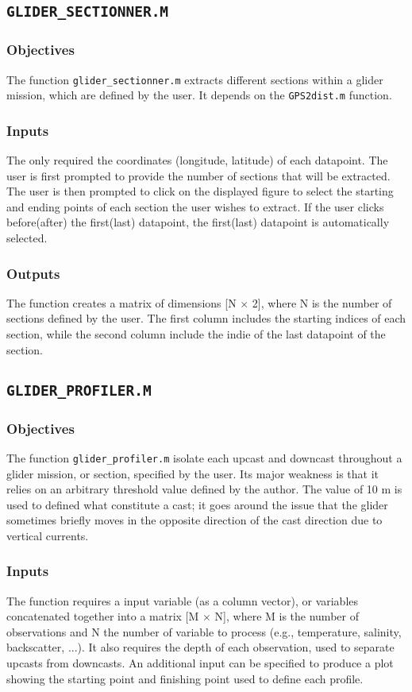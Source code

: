 \documentclass[11pt,A4]{report}
\begin{document}
\subsection{\texttt{GLIDER\_SECTIONNER.M}}
\subsubsection{Objectives}
The function \texttt{glider\_sectionner.m} extracts different sections within a glider mission, which are defined by the user. It depends on the \texttt{GPS2dist.m} function.

\subsubsection{Inputs}
The only required the coordinates (longitude, latitude) of each datapoint. The user is first prompted to provide the number of sections that will be extracted. The user is then prompted to click on the displayed figure to select the starting and ending points of each section the user wishes to extract. If the user clicks before(after) the first(last) datapoint, the first(last) datapoint is automatically selected.

\subsubsection{Outputs}
The function creates a matrix of dimensions [N $\times$ 2], where N is the number of sections defined by the user. The first column includes the starting indices of each section, while the second column include the indie of the last datapoint of the section. 

\subsection{\texttt{GLIDER\_PROFILER.M}}
\subsubsection{Objectives}
The function \texttt{glider\_profiler.m} isolate each upcast and downcast throughout a glider mission, or section, specified by the user. Its major weakness is that it relies on an arbitrary threshold value defined by the author. The value of 10 m is used to defined what constitute a cast; it goes around the issue that the glider sometimes briefly moves in the opposite direction of the cast direction due to vertical currents.

\subsubsection{Inputs}
The function requires a input variable (as a column vector), or variables concatenated together into a matrix [M $\times$ N], where M is the number of observations and N the number of variable to process (e.g., temperature, salinity, backscatter, ...). It also requires the depth of each observation, used to separate upcasts from downcasts. An additional input can be specified to produce a plot showing the starting point and finishing point used to define each profile. 
\end{document}
